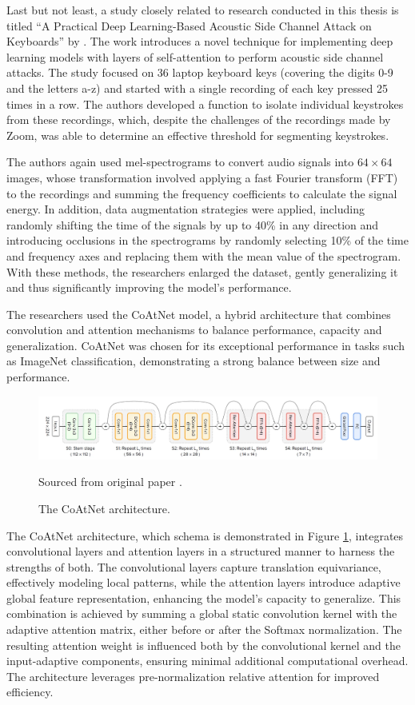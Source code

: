 \documentclass[a4paper,11pt,twoside]{report}
\theoremstyle{definition}
\begin{document}
Last but not least, a study closely related to research conducted in this thesis is titled “A Practical Deep Learning-Based Acoustic Side Channel Attack on Keyboards” by \textit{\cite{CoAtNet2023}}. The work introduces a novel technique for implementing deep learning models with layers of self-attention to perform acoustic side channel attacks. The study focused on 36 laptop keyboard keys (covering the digits 0-9 and the letters a-z) and started with a single recording of each key pressed 25 times in a row. The authors developed a function to isolate individual keystrokes from these recordings, which, despite the challenges of the recordings made by Zoom, was able to determine an effective threshold for segmenting keystrokes.

The authors again used mel-spectrograms to convert audio signals into $64 \times 64$ images, whose transformation involved applying a fast Fourier transform (FFT) to the recordings and summing the frequency coefficients to calculate the signal energy. In addition, data augmentation strategies were applied, including randomly shifting the time of the signals by up to 40\% in any direction and introducing occlusions in the spectrograms by randomly selecting 10\% of the time and frequency axes and replacing them with the mean value of the spectrogram. With these methods, the researchers enlarged the dataset, gently generalizing it and thus significantly improving the model's performance.

The researchers used the CoAtNet model, a hybrid architecture that combines convolution and attention mechanisms to balance performance, capacity and generalization. CoAtNet was chosen for its exceptional performance in tasks such as ImageNet classification, demonstrating a strong balance between size and performance.

\begin{figure}[h!]
    \centering
    \includegraphics[width=\textwidth]{img_related_work/CoAtNet.png}
    \caption{The CoAtNet architecture.}
    \footnotesize{Sourced from original paper \cite{CoAtNet}.}
    \label{fig:CoAtNet}
\end{figure}

The CoAtNet architecture, which schema is demonstrated in Figure \ref{fig:CoAtNet}, integrates convolutional layers and attention layers in a structured manner to harness the strengths of both. The convolutional layers capture translation equivariance, effectively modeling local patterns, while the attention layers introduce adaptive global feature representation, enhancing the model's capacity to generalize. This combination is achieved by summing a global static convolution kernel with the adaptive attention matrix, either before or after the Softmax normalization. The resulting attention weight is influenced both by the convolutional kernel and the input-adaptive components, ensuring minimal additional computational overhead. The architecture leverages pre-normalization relative attention for improved efficiency.
\end{document}
